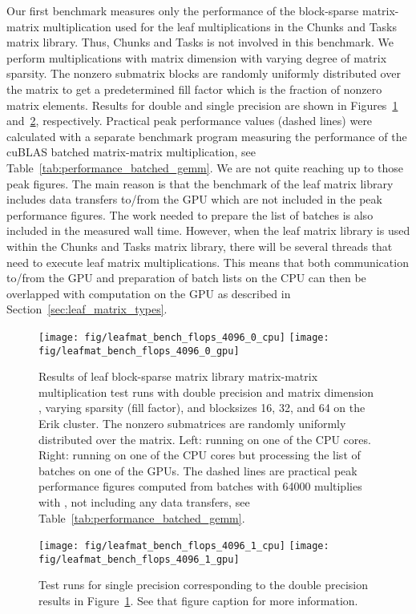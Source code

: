 \documentclass{elsarticle}
\begin{document}
Our first benchmark measures only the performance of the block-sparse
matrix-matrix multiplication used for the leaf multiplications in the
Chunks and Tasks matrix library. Thus, Chunks and Tasks is not
involved in this benchmark. We perform multiplications with matrix
dimension  with varying degree of matrix
sparsity. The nonzero submatrix blocks are randomly uniformly
distributed over the matrix to get a predetermined fill factor which
is the fraction of nonzero matrix elements. Results for double and
single precision are shown in Figures~\ref{fig:leafmat_bench_double}
and~\ref{fig:leafmat_bench_single}, respectively.  Practical peak
performance values (dashed lines) were calculated with a separate
benchmark program measuring the performance of the cuBLAS batched
matrix-matrix multiplication, see
Table~\ref{tab:performance_batched_gemm}. We are not quite reaching up
to those peak figures. The main reason is that the benchmark of the
leaf matrix library includes data transfers to/from the GPU which are
not included in the peak performance figures. The work needed to
prepare the list of batches is also included in the measured wall
time. However, when the leaf matrix library is used within the Chunks
and Tasks matrix library, there will be several threads that need to
execute leaf matrix multiplications. This means that both
communication to/from the GPU and preparation of batch lists on the
CPU can then be overlapped with computation on the GPU as described in
Section~\ref{sec:leaf_matrix_types}.

\begin{figure}
  \begin{center}
    \texttt{[image: fig/leafmat\_bench\_flops\_4096\_0\_cpu]}
    \texttt{[image: fig/leafmat\_bench\_flops\_4096\_0\_gpu]}
  \end{center}
  \caption{Results of leaf block-sparse matrix library matrix-matrix
    multiplication test runs with double precision and matrix
    dimension , varying sparsity (fill factor), and
    blocksizes 16, 32, and 64 on the Erik cluster. The nonzero
    submatrices are randomly uniformly distributed over the matrix.
    Left: running on one of the CPU cores. Right: running on one of
    the CPU cores but processing the list of batches on one of the
    GPUs.  The dashed lines are practical peak performance figures
    computed from batches with 64000  multiplies with , not including any data transfers, see
    Table~\ref{tab:performance_batched_gemm}. \label{fig:leafmat_bench_double}}
\end{figure}
\begin{figure}
  \begin{center}
    \texttt{[image: fig/leafmat\_bench\_flops\_4096\_1\_cpu]}
    \texttt{[image: fig/leafmat\_bench\_flops\_4096\_1\_gpu]}
  \end{center}
  \caption{Test runs for single precision corresponding to the double
    precision results in Figure~\ref{fig:leafmat_bench_double}. See
    that figure caption for more information.
 \label{fig:leafmat_bench_single}}
\end{figure}
\end{document}

